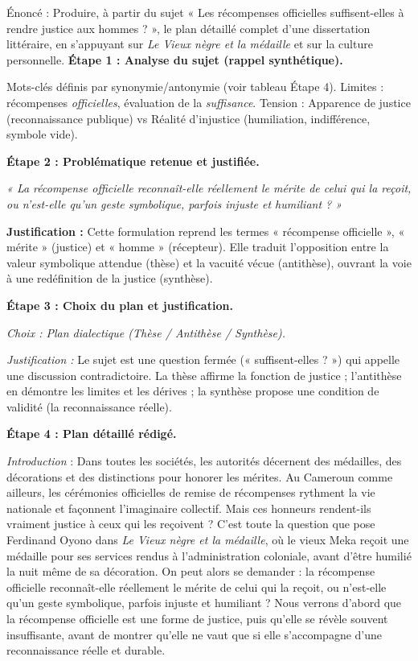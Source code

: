 \documentclass[11pt]{article}
\begin{document}
\begin{exoresolu}
Énoncé : Produire, à partir du sujet « Les récompenses officielles suffisent-elles à rendre justice aux hommes ? », le plan détaillé complet d'une dissertation littéraire, en s'appuyant sur \emph{Le Vieux nègre et la médaille} et sur la culture personnelle.
\tcblower
\textbf{Étape 1 : Analyse du sujet (rappel synthétique).}

Mots-clés définis par synonymie/antonymie (voir tableau Étape 4). Limites : récompenses \emph{officielles}, évaluation de la \emph{suffisance}. Tension : Apparence de justice (reconnaissance publique) vs Réalité d'injustice (humiliation, indifférence, symbole vide).

\textbf{Étape 2 : Problématique retenue et justifiée.}

\emph{« La récompense officielle reconnaît-elle réellement le mérite de celui qui la reçoit, ou n'est-elle qu'un geste symbolique, parfois injuste et humiliant ? »}

\textbf{Justification :} Cette formulation reprend les termes « récompense officielle », « mérite » (justice) et « homme » (récepteur). Elle traduit l'opposition entre la valeur symbolique attendue (thèse) et la vacuité vécue (antithèse), ouvrant la voie à une redéfinition de la justice (synthèse).

\textbf{Étape 3 : Choix du plan et justification.}

\emph{Choix : Plan dialectique (Thèse / Antithèse / Synthèse).}

\emph{Justification :} Le sujet est une question fermée (« suffisent-elles ? ») qui appelle une discussion contradictoire. La thèse affirme la fonction de justice ; l'antithèse en démontre les limites et les dérives ; la synthèse propose une condition de validité (la reconnaissance réelle).

\textbf{Étape 4 : Plan détaillé rédigé.}

\emph{Introduction} : Dans toutes les sociétés, les autorités décernent des médailles, des décorations et des distinctions pour honorer les mérites. Au Cameroun comme ailleurs, les cérémonies officielles de remise de récompenses rythment la vie nationale et façonnent l'imaginaire collectif. Mais ces honneurs rendent-ils vraiment justice à ceux qui les reçoivent ? C'est toute la question que pose Ferdinand Oyono dans \emph{Le Vieux nègre et la médaille}, où le vieux Meka reçoit une médaille pour ses services rendus à l'administration coloniale, avant d'être humilié la nuit même de sa décoration. On peut alors se demander : la récompense officielle reconnaît-elle réellement le mérite de celui qui la reçoit, ou n'est-elle qu'un geste symbolique, parfois injuste et humiliant ? Nous verrons d'abord que la récompense officielle est une forme de justice, puis qu'elle se révèle souvent insuffisante, avant de montrer qu'elle ne vaut que si elle s'accompagne d'une reconnaissance réelle et durable.


\end{exoresolu}
\end{document}
